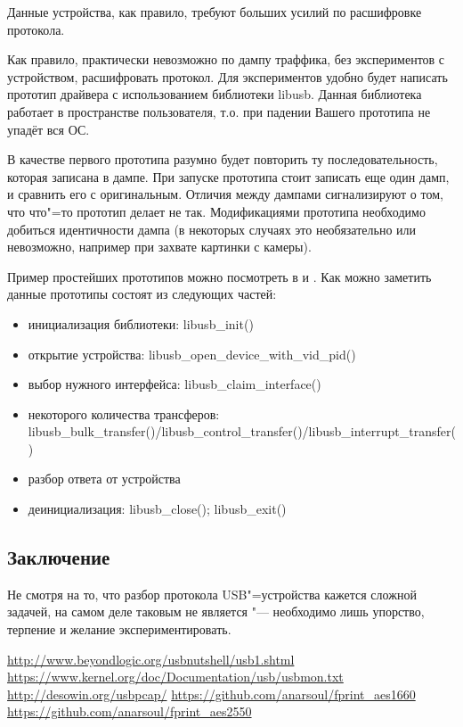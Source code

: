 \documentclass[10pt, a5paper]{article}
\begin{document}
Данные устройства, как правило, требуют больших усилий по расшифровке протокола.

Как правило, практически невозможно по дампу траффика, без экспериментов с устройством, расшифровать протокол. Для экспериментов удобно будет написать прототип драйвера с использованием библиотеки libusb. Данная библиотека работает в пространстве пользователя, т.о. при падении Вашего прототипа не упадёт вся ОС.

В качестве первого прототипа разумно будет повторить ту последовательность, которая записана в дампе. При запуске прототипа стоит записать еще один дамп, и сравнить его с оригинальным. Отличия между дампами сигнализируют о том, что что"=то прототип делает не так. Модификациями прототипа необходимо добиться идентичности дампа (в некоторых случаях это необязательно или невозможно, например при захвате картинки с камеры).

Пример простейших прототипов можно посмотреть в \cite{Anar4} и \cite{Anar5}. Как можно заметить данные прототипы состоят из следующих частей:

\begin{itemize}
  \item инициализация библиотеки: libusb\_init()
  \item открытие устройства: libusb\_open\_device\_with\_vid\_pid()
  \item выбор нужного интерфейса:  libusb\_claim\_interface()
  \item некоторого количества трансферов: libusb\_bulk\_transfer()/libusb\_control\_transfer()/libusb\_interrupt\_transfer()
  \item разбор ответа от устройства
  \item деинициализация: libusb\_close(); libusb\_exit()
\end{itemize}

\subsection*{Заключение}

Не смотря на то, что разбор протокола USB"=устройства кажется сложной задачей, на самом деле таковым не является "--- необходимо лишь упорство, терпение и желание экспериментировать.

\begin{thebibliography}{9}
 \url{http://www.beyondlogic.org/usbnutshell/usb1.shtml}
 \url{https://www.kernel.org/doc/Documentation/usb/usbmon.txt}
 \url{http://desowin.org/usbpcap/}
 \url{https://github.com/anarsoul/fprint\_aes1660}
 \url{https://github.com/anarsoul/fprint\_aes2550}
\end{thebibliography}
\end{document}
